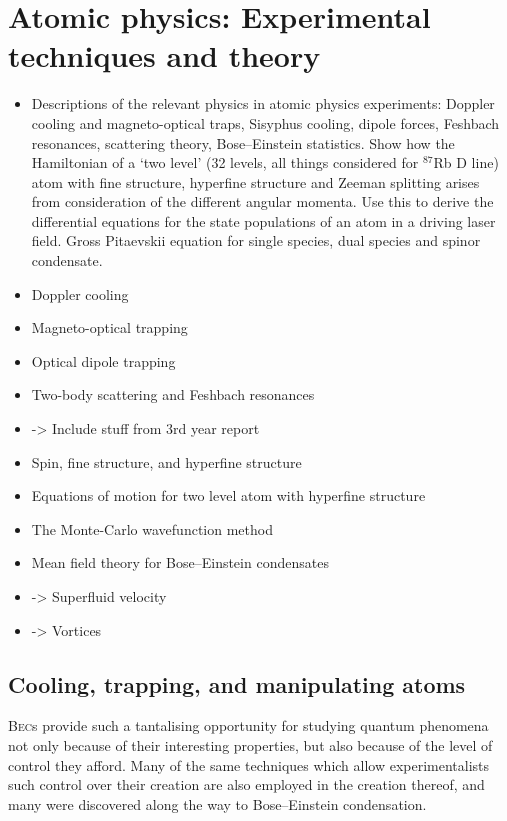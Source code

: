 \chapter{Atomic physics: Experimental techniques and theory}\label{chap:atomic_physics}

\begin{itemize}
\item Descriptions of the relevant physics in atomic physics experiments: Doppler cooling and magneto-optical traps, Sisyphus cooling, dipole forces, Feshbach resonances, scattering theory, Bose–Einstein statistics. Show how the Hamiltonian of a `two level' (32 levels, all things considered for $^{87}$Rb D line) atom with fine structure, hyperfine structure and Zeeman splitting arises from consideration of the different angular momenta. Use this to derive the differential equations for the state populations of an atom in a driving laser field. Gross Pitaevskii equation for single species, dual species and spinor condensate.

\item{Doppler cooling}
\item{Magneto-optical trapping}
\item{Optical dipole trapping}
\item{Two-body scattering and Feshbach resonances}
\item{ -> Include stuff from 3rd year report}
\item{Spin, fine structure, and hyperfine structure}
\item{Equations of motion for two level atom with hyperfine structure}
\item{The Monte-Carlo wavefunction method}
\item{Mean field theory for Bose–Einstein condensates}
\item{ -> Superfluid velocity}
\item{ -> Vortices}

\end{itemize}
\section{Cooling, trapping, and manipulating atoms}
\textsc{Bec}s provide such a tantalising opportunity for studying quantum phenomena not only because of their interesting properties, but also because of the level of control they afford. Many of the same techniques which allow experimentalists such control over their creation are also employed in the creation thereof, and many were discovered along the way to Bose--Einstein condensation.

